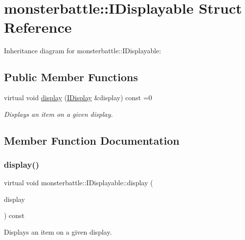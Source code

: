 \hypertarget{structmonsterbattle_1_1IDisplayable}{}\section{monsterbattle\+:\+:I\+Displayable Struct Reference}
\label{structmonsterbattle_1_1IDisplayable}


Inheritance diagram for monsterbattle\+:\+:I\+Displayable\+:
\subsection*{Public Member Functions}
\begin{DoxyCompactItemize}
\item 
virtual void \hyperlink{structmonsterbattle_1_1IDisplayable_a2e7b5b2259cd0f00d65a99752072e66e}{display} (\hyperlink{structmonsterbattle_1_1IDisplay}{I\+Display} \&display) const =0
\begin{DoxyCompactList}\small\item\em Displays an item on a given display. \end{DoxyCompactList}\end{DoxyCompactItemize}


\subsection{Member Function Documentation}
\mbox{\label{structmonsterbattle_1_1IDisplayable_a2e7b5b2259cd0f00d65a99752072e66e}} 
\subsubsection{\texorpdfstring{display()}{display()}}
{\footnotesize\ttfamily virtual void monsterbattle\+::\+I\+Displayable\+::display (\begin{DoxyParamCaption}\item[{\hyperlink{structmonsterbattle_1_1IDisplay}{I\+Display} \&}]{display }\end{DoxyParamCaption}) const\hspace{0.3cm}{\ttfamily [pure virtual]}}



Displays an item on a given display. 


